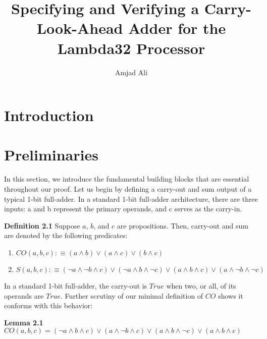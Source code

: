 \documentclass{article}
\title{Specifying and Verifying a Carry-Look-Ahead Adder for the Lambda32 Processor}
\author{Amjad Ali}
\begin{document}
\maketitle

\begin{abstract}
\lipsum[1]
\end{abstract}

\section{Introduction}
\lipsum[1-2] 

\section{Preliminaries}
In this section, we introduce the fundamental building blocks that are essential throughout our proof. Let us begin by defining a carry-out and sum output of a typical 1-bit full-adder. In a standard 1-bit full-adder architecture, there are three inputs: a and b represent the primary operands, and c serves as the carry-in.

\noindent \textbf{Definition 2.1} Suppose $a$, $b$, and $c$ are propositions. Then, carry-out and sum are denoted by the following predicates:

\begin{enumerate}
	\item $CO(a, b, c) :\equiv (a \land b) \lor (a \land c) \lor (b \land c)$
	\item $S(a, b, c) :\equiv (\lnot a \land \lnot b \land c) \lor (\lnot a \land b \land \lnot c) \lor (a \land b \land c) \lor (a \land \lnot b \land \lnot c)$
\end{enumerate}

In a standard 1-bit full-adder, the carry-out is  $True$ when two, or all, of its operands are $True$. Further scrutiny of our minimal definition of $CO$ shows it conforms with this behavior:

\noindent \textbf{Lemma 2.1}  $CO(a, b, c) =  (\lnot a \land b \land c) \lor (a \land \lnot b \land c) \lor (a \land b \land \lnot c) \lor (a \land b \land c)$ 
\end{document}
